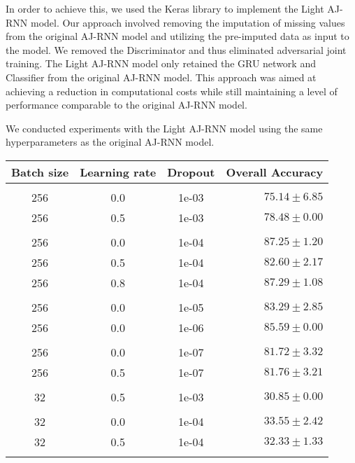 In order to achieve this, we used the Keras library to implement the Light AJ-RNN model.
Our approach involved removing the imputation of missing values from the original AJ-RNN model and utilizing the pre-imputed data as input to the model.
We removed the Discriminator and thus eliminated adversarial joint training.
The Light AJ-RNN model only retained the GRU network and Classifier from the original AJ-RNN model.
This approach was aimed at achieving a reduction in computational costs while still maintaining a level of performance comparable to the original AJ-RNN model.

We conducted experiments with the Light AJ-RNN model using the same hyperparameters as the original AJ-RNN model.


\begin{table}[H]
  \centering
  \begin{tabular}{cccr} 
      Batch size & Learning rate & Dropout & Overall Accuracy\\[0.2cm] 
      \hline \\[-0.2cm]
      256 & 0.0 & 1e-03 & $75.14 \pm 6.85$\\
      256 & 0.5 & 1e-03 & $78.48 \pm 0.00$\\[0.05cm] \hline \\[-0.25cm]

      256 & 0.0 & 1e-04 & $87.25 \pm 1.20$\\
      256 & 0.5 & 1e-04 & $82.60 \pm 2.17$\\
      256 & 0.8 & 1e-04 & $87.29 \pm 1.08$\\[0.05cm] \hline \\[-0.25cm]

      256 & 0.0 & 1e-05 & $83.29 \pm 2.85$\\
      256 & 0.0 & 1e-06 & $85.59 \pm 0.00$\\[0.05cm] \hline \\[-0.25cm]

      256 & 0.0 & 1e-07 & $81.72 \pm 3.32$\\
      256 & 0.5 & 1e-07 & $81.76 \pm 3.21$\\[0.05cm] \hline \\[-0.25cm]

      32  & 0.5 & 1e-03 & $30.85 \pm 0.00$\\[0.05cm] \hline \\[-0.25cm]

      32  & 0.0 & 1e-04 & $33.55 \pm 2.42$\\
      32  & 0.5 & 1e-04 & $32.33 \pm 1.33$\\[0.05cm] \hline \\[-0.25cm]


\end{tabular}
\end{table}
